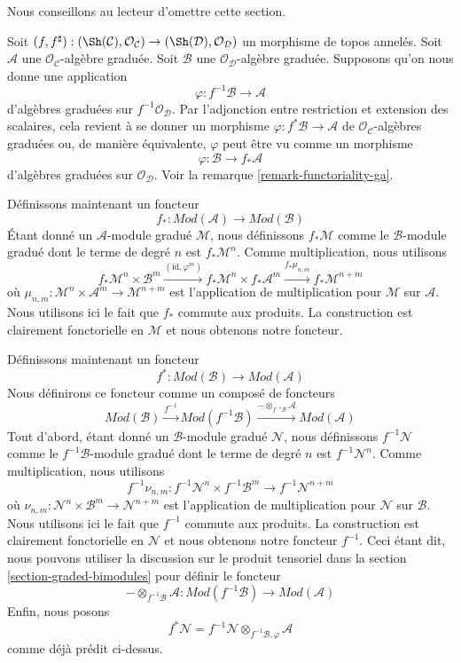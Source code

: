 \noindent
Nous conseillons au lecteur d'omettre cette section.

\medskip\noindent
Soit $(f, f^\sharp) : (\Sh(\mathcal{C}), \mathcal{O}_\mathcal{C})
\to (\Sh(\mathcal{D}), \mathcal{O}_\mathcal{D})$ un morphisme
de topos annelés. Soit $\mathcal{A}$ une
$\mathcal{O}_\mathcal{C}$-algèbre graduée. Soit $\mathcal{B}$ une
$\mathcal{O}_\mathcal{D}$-algèbre graduée. Supposons qu'on nous donne
une application
$$
\varphi : f^{-1}\mathcal{B} \to \mathcal{A}
$$ d'algèbres
graduées sur $f^{-1}\mathcal{O}_\mathcal{D}$. Par l'adjonction
entre restriction et extension des scalaires, cela revient à se
donner un morphisme $\varphi : f^*\mathcal{B} \to \mathcal{A}$ de
$\mathcal{O}_\mathcal{C}$-algèbres graduées ou, de manière équivalente,
$\varphi$ peut être vu comme un morphisme
$$
\varphi : \mathcal{B} \to f_*\mathcal{A}
$$
d'algèbres graduées sur $\mathcal{O}_\mathcal{D}$.
Voir la remarque \ref{remark-functoriality-ga}.

\medskip\noindent
Définissons maintenant un
foncteur $$
f_*
: \textit{Mod}(\mathcal{A})
\longrightarrow
\textit{Mod}(\mathcal{B})
$$
Étant donné un $\mathcal{A}$-module gradué $\mathcal{M}$, nous
définissons $f_*\mathcal{M}$ comme le $\mathcal{B}$-module
gradué dont le terme de degré $n$ est $f_*\mathcal{M}^n$. Comme
multiplication,
nous utilisons $$
f_*\mathcal{M}^n \times \mathcal{B}^m
\xrightarrow{(\text{id}, \varphi^m)}
f_*\mathcal{M}^n \times f_*\mathcal{A}^m
\xrightarrow{f_*\mu_{n, m}}
f_*\mathcal{M}^{n + m}
$$
où $\mu_{n, m} : \mathcal{M}^n \times \mathcal{A}^m
\to \mathcal{M}^{n + m}$ est l'application de multiplication pour $\mathcal{M}$ sur
$\mathcal{A}$. Nous utilisons ici le fait que $f_*$ commute aux produits.
La construction est clairement fonctorielle en
$\mathcal{M}$ et nous obtenons notre foncteur.

\medskip\noindent
Définissons maintenant un
foncteur $$
f^*
: \textit{Mod}(\mathcal{B})
\longrightarrow
\textit{Mod}(\mathcal{A})
$$
Nous définirons ce foncteur comme un composé de foncteurs
$$
\textit{Mod}(\mathcal{B})
\xrightarrow{f^{-1}}
\textit{Mod}(f^{-1}\mathcal{B})
\xrightarrow{ - \otimes_{f^{-1}\mathcal{B}} \mathcal{A}}
\textit{Mod}(\mathcal{A})
$$ Tout d'abord,
étant donné un $\mathcal{B}$-module gradué $\mathcal{N}$, nous définissons
$f^{-1}\mathcal{N}$ comme le $f^{-1}\mathcal{B}$-module gradué
dont le terme de degré $n$ est $f^{-1}\mathcal{N}^n$. Comme multiplication,
nous
utilisons $$
f^{-1}\nu_{n, m}
: f^{-1}\mathcal{N}^n \times f^{-1}\mathcal{B}^m
\longrightarrow
f^{-1}\mathcal{N}^{n + m}
$$
où $\nu_{n, m} : \mathcal{N}^n \times \mathcal{B}^m
\to \mathcal{N}^{n + m}$ est l'application de multiplication pour $\mathcal{N}$ sur
$\mathcal{B}$. Nous utilisons ici le fait que $f^{-1}$ commute aux produits.
La construction est clairement fonctorielle en
$\mathcal{N}$ et nous obtenons notre foncteur $f^{-1}$.
Ceci étant dit, nous pouvons utiliser la
discussion sur le produit tensoriel dans la section \ref{section-graded-bimodules}
pour définir
le foncteur $$
- \otimes_{f^{-1}\mathcal{B}} \mathcal{A}
: \textit{Mod}(f^{-1}\mathcal{B})
\longrightarrow
\textit{Mod}(\mathcal{A})
$$
Enfin, nous
posons $$
f^*\mathcal{N}
= f^{-1}\mathcal{N} \otimes_{f^{-1}\mathcal{B}, \varphi} \mathcal{A}
$$
comme déjà prédit ci-dessus.

